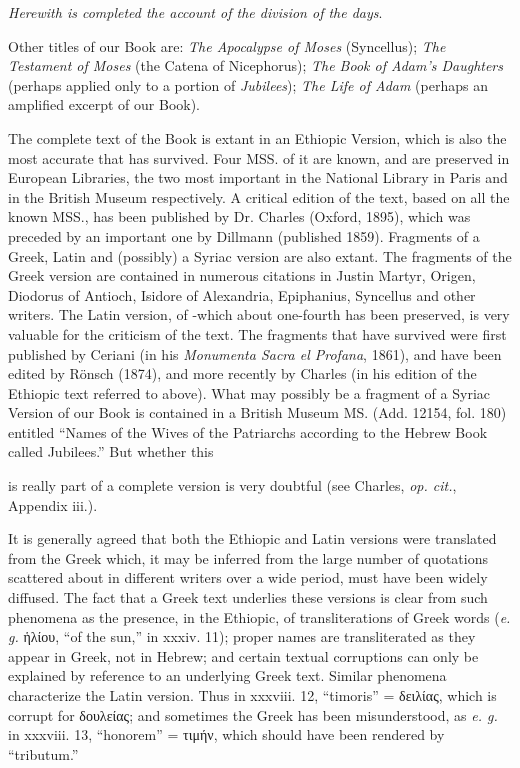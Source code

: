 \emph{Herewith is completed the account of the division of the days}.

Other titles of our Book are: \emph{The Apocalypse of Moses} (Syncellus); \emph{The Testament of Moses} (the Catena of Nicephorus); \emph{The Book of Adam's Daughters} (perhaps applied only to a portion of \emph{Jubilees}); \emph{The Life of Adam} (perhaps an amplified excerpt of our Book).


The complete text of the Book is extant in an Ethiopic Version, which is also the most accurate that has survived. Four MSS. of it are known, and are preserved in European Libraries, the two most important in the National Library in Paris and in the British Museum respectively. A critical edition of the text, based on all the known MSS., has been published by Dr. Charles (Oxford, 1895), which was preceded by an important one by Dillmann (published 1859). Fragments of a Greek, Latin and (possibly) a Syriac version are also extant. The fragments of the Greek version are contained in numerous citations in Justin Martyr, Origen, Diodorus of Antioch, Isidore of Alexandria, Epiphanius, Syncellus and other writers. The Latin version, of -which about one-fourth has been preserved, is very valuable for the criticism of the text. The fragments that have survived were first published by Ceriani (in his \emph{Monumenta Sacra el Profana}, 1861), and have been edited by Rönsch (1874), and more recently by Charles (in his edition of the Ethiopic text referred to above). What may possibly be a fragment of a Syriac Version of our Book is contained in a British Museum MS. (Add. 12154, fol. 180) entitled ``Names of the Wives of the Patriarchs according to the Hebrew Book called Jubilees.'' But whether this

is really part of a complete version is very doubtful (see Charles, \emph{op. cit.}, Appendix iii.).

It is generally agreed that both the Ethiopic and Latin versions were translated from the Greek which, it may be inferred from the large number of quotations scattered about in different writers over a wide period, must have been widely diffused. The fact that a Greek text underlies these versions is clear from such phenomena as the presence, in the Ethiopic, of transliterations of Greek words (\emph{e. g.} \textgreek{ἡλίου}, ``of the sun,'' in xxxiv. 11); proper names are transliterated as they appear in Greek, not in Hebrew; and certain textual corruptions can only be explained by reference to an underlying Greek text. Similar phenomena characterize the Latin version. Thus in xxxviii. 12, ``timoris'' = \textgreek{δειλίας}, which is corrupt for \textgreek{δουλείας}; and sometimes the Greek has been misunderstood, as \emph{e. g.} in xxxviii. 13, ``honorem'' = \textgreek{τιμήν}, which should have been rendered by ``tributum.''

